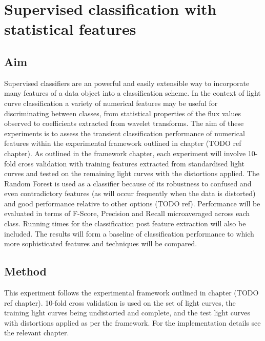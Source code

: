 
%
%
%
%
	
	\chapter{Supervised classification with statistical features} %
	\section{Aim}
		Supervised classifiers are an powerful and easily extensible way to incorporate many features of a data object into a classification scheme. In the context of light curve classification a variety of numerical features may be useful for discriminating between classes, from statistical properties of the flux values observed to coefficients extracted from wavelet transforms. The aim of these experiments is to assess the transient classification performance of numerical features within the experimental framework outlined in chapter (TODO ref chapter). As outlined in the framework chapter, each experiment will involve 10-fold cross validation with training features extracted from standardised light curves and tested on the remaining light curves with the distortions applied. The Random Forest is used as a classifier because of its robustness to confused and even contradictory features (as will occur frequently when the data is distorted) and good performance relative to other options (TODO ref). Performance will be evaluated in terms of F-Score, Precision and Recall microaveraged across each class. Running times for the classification post feature extraction will also be included. The results will form a baseline of classification performance to which more sophisticated features and techniques will be compared.

	\section{Method}
	This experiment follows the experimental framework outlined in chapter (TODO ref chapter). 10-fold cross validation is used on the set of light curves, the training light curves being undistorted and complete, and the test light curves with distortions applied as per the framework. For the implementation details see the relevant chapter.



